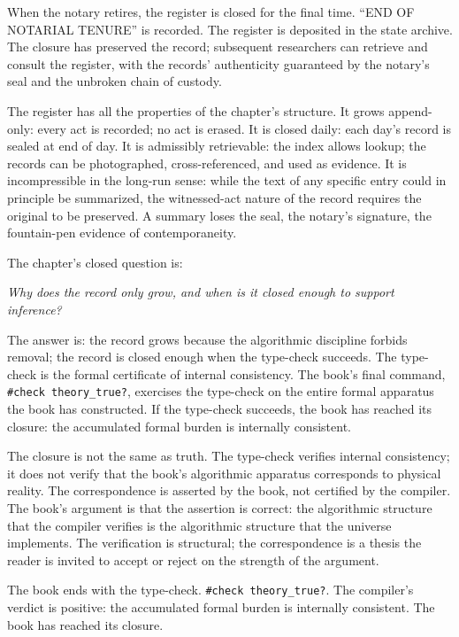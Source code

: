 \begin{chapteressay}
When the notary retires, the register is closed for the final
time. ``END OF NOTARIAL TENURE'' is recorded. The register is
deposited in the state archive. The closure has preserved the
record; subsequent researchers can retrieve and consult the
register, with the records' authenticity guaranteed by the
notary's seal and the unbroken chain of custody.

The register has all the properties of the chapter's structure.
It grows append-only: every act is recorded; no act is erased.
It is closed daily: each day's record is sealed at end of day.
It is admissibly retrievable: the index allows lookup; the
records can be photographed, cross-referenced, and used as
evidence. It is incompressible in the long-run sense: while the
text of any specific entry could in principle be summarized, the
witnessed-act nature of the record requires the original to be
preserved. A summary loses the seal, the notary's signature, the
fountain-pen evidence of contemporaneity.

The chapter's closed question is:

\begin{center}
\emph{Why does the record only grow, and when is it closed enough
to support inference?}
\end{center}

The answer is: the record grows because the algorithmic discipline
forbids removal; the record is closed enough when the type-check
succeeds. The type-check is the formal certificate of internal
consistency. The book's final command, \texttt{\#check
theory\_true?}, exercises the type-check on the entire formal
apparatus the book has constructed. If the type-check succeeds,
the book has reached its closure: the accumulated formal burden
is internally consistent.

The closure is not the same as truth. The type-check verifies
internal consistency; it does not verify that the book's
algorithmic apparatus corresponds to physical reality. The
correspondence is asserted by the book, not certified by the
compiler. The book's argument is that the assertion is correct:
the algorithmic structure that the compiler verifies is the
algorithmic structure that the universe implements. The
verification is structural; the correspondence is a thesis the
reader is invited to accept or reject on the strength of the
argument.

The book ends with the type-check. \texttt{\#check theory\_true?}.
The compiler's verdict is positive: the accumulated formal
burden is internally consistent. The book has reached its
closure.


\end{chapteressay}
